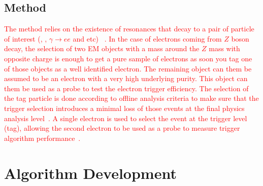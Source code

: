 


\subsection{\TnP Method}\label{ssec:tnp}

\textcolor{red}{The \tnp{} method relies on the existence of resonances that decay to a pair of particle of interest (\Zee{}, \Jee{}, $\gamma \rightarrow ee$ and etc) ~\cite{PERF-2016-01}. In the case of electrons coming from $Z$ boson decay, the selection of two EM objects with a mass around the $Z$ mass with opposite charge is enough to get a pure sample of electrons as soon you tag one of those objects as a well identified electron. The remaining object can them be assumed to be an electron with a very high underlying purity. This object can them be used as a probe to test the electron trigger efficiency. The selection of the tag particle is done according to offline analysis criteria to make sure that the trigger selection introduces a minimal loss of those events at the final physics analysis level~\cite{aaboud2019electron}. A single electron is used to select the event at the trigger level (tag), allowing the second electron to be used as a probe to measure trigger algorithm performance~\cite{aad2020performance}.}


\section{Algorithm Development}\label{ssec:rnn_for_online_and_eletrons}


